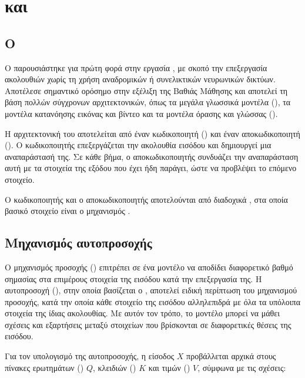 \section{ και }
\label{sec:transformer-vision-transformer}

\subsection{O }
\label{subsec:transformer}

O  παρουσιάστηκε για πρώτη φορά στην εργασία
 \cite{vaswani2017attention}, με σκοπό την
επεξεργασία ακολουθιών χωρίς τη χρήση αναδρομικών ή συνελικτικών νευρωνικών
δικτύων. Αποτέλεσε σημαντικό ορόσημο στην εξέλιξη της Βαθιάς Μάθησης και
αποτελεί τη βάση πολλών σύγχρονων αρχιτεκτονικών, όπως τα μεγάλα γλωσσικά
μοντέλα (), τα μοντέλα κατανόησης εικόνας και
βίντεο και τα μοντέλα όρασης και γλώσσας ().

Η αρχιτεκτονική  του  αποτελείται από έναν
κωδικοποιητή () και έναν αποκωδικοποιητή (). Ο 
κωδικοποιητής επεξεργάζεται την ακολουθία εισόδου και δημιουργεί μια
αναπαράστασή της. Σε κάθε βήμα, ο αποκωδικοποιητής συνδυάζει την
αναπαράσταση αυτή με τα στοιχεία της εξόδου που έχει ήδη παράγει, ώστε να
προβλέψει το επόμενο στοιχείο.

Ο κωδικοποιητής και ο αποκωδικοποιητής αποτελούνται από διαδοχικά
, στα οποία βασικό στοιχείο είναι ο μηχανισμός
.

\subsection{Μηχανισμός αυτοπροσοχής}
\label{subsec:self-attention}

Ο μηχανισμός προσοχής () επιτρέπει σε ένα μοντέλο να αποδίδει
διαφορετικό βαθμό σημασίας στα επιμέρους στοιχεία της εισόδου κατά την
επεξεργασία της. Η αυτοπροσοχή (), στην οποία βασίζεται ο , αποτελεί ειδική περίπτωση
του μηχανισμού προσοχής, κατά την οποία κάθε στοιχείο της εισόδου
αλληλεπιδρά με όλα τα υπόλοιπα στοιχεία της ίδιας ακολουθίας. Με αυτόν τον
τρόπο, το μοντέλο μπορεί να μάθει σχέσεις και εξαρτήσεις μεταξύ στοιχείων που
βρίσκονται σε διαφορετικές θέσεις της εισόδου.

Για τον υπολογισμό της αυτοπροσοχής, η είσοδος \(X\) προβάλλεται αρχικά στους
πίνακες ερωτημάτων () \(Q\), κλειδιών () \(K\) και τιμών
() \(V\), σύμφωνα με τις σχέσεις:

